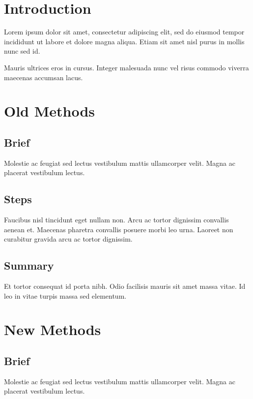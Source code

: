 \documentclass{article}
\begin{document}
\section{Introduction}

Lorem ipsum dolor sit amet, consectetur adipiscing elit, sed do eiusmod tempor incididunt ut labore et dolore magna aliqua.
Etiam sit amet nisl purus in mollis nunc sed id.

Mauris ultrices eros in cursus.
Integer malesuada nunc vel risus commodo viverra maecenas accumsan lacus.

\section{Old Methods}

\subsection{Brief}

Molestie ac feugiat sed lectus vestibulum mattis ullamcorper velit.
Magna ac placerat vestibulum lectus.

\subsection{Steps}

Faucibus nisl tincidunt eget nullam non.
Arcu ac tortor dignissim convallis aenean et.
Maecenas pharetra convallis posuere morbi leo urna.
Laoreet non curabitur gravida arcu ac tortor dignissim.

\subsection{Summary}

Et tortor consequat id porta nibh.
Odio facilisis mauris sit amet massa vitae.
Id leo in vitae turpis massa sed elementum.

\section{New Methods}

\subsection{Brief}

Molestie ac feugiat sed lectus vestibulum mattis ullamcorper velit.
Magna ac placerat vestibulum lectus.
\end{document}
